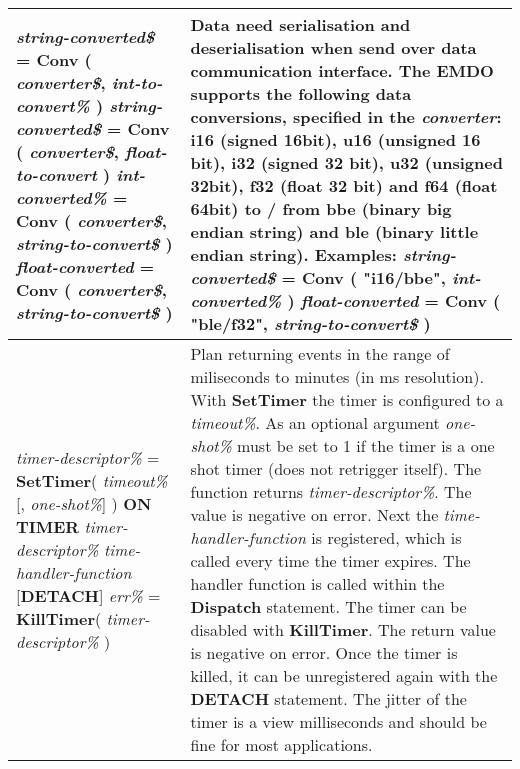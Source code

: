 \begin{table}[]
\begin{tabular}{|p{4cm}|p{10cm}|}
\\ \hline
\textit{string-converted\$} = \textbf{Conv} ( \textit{converter\$}, \textit{int-to-convert\%} )\newline
\textit{string-converted\$} = \textbf{Conv} ( \textit{converter\$}, \textit{float-to-convert} )\newline
\textit{int-converted\%} = \textbf{Conv} ( \textit{converter\$}, \textit{string-to-convert\$} )\newline
\textit{float-converted} = \textbf{Conv} ( \textit{converter\$}, \textit{string-to-convert\$} )
& Data need serialisation and deserialisation when send over data communication interface. The EMDO supports the following data conversions, specified in the \textit{converter}:\newline
i16 (signed 16bit), u16 (unsigned 16 bit), i32 (signed 32 bit), u32 (unsigned 32bit), f32 (float 32 bit) and f64 (float 64bit) to / from bbe (binary big endian string) and ble (binary little endian string).\newline
Examples:
\textit{string-converted\$} = \textbf{Conv} ( "i16/bbe", \textit{int-converted\%} ) \newline
\textit{float-converted} = \textbf{Conv} ( "ble/f32", \textit{string-to-convert\$} )
\\ \hline
\textit{timer-descriptor\%} = \textbf{SetTimer}( \textit{timeout\%} [, \textit{one-shot\%}] )\newline
\textbf{ON TIMER} \textit{timer-descriptor\%} \textit{time-handler-function} [\textbf{DETACH}]
\textit{err\%} = \textbf{KillTimer}( \textit{timer-descriptor\%} )
& Plan returning events in the range of miliseconds to minutes (in ms resolution). With \textbf{SetTimer} the timer is configured to a \textit{timeout\%}. As an optional argument \textit{one-shot\%} must be set to 1 if the timer is a one shot timer (does not retrigger itself). The function returns \textit{timer-descriptor\%}. The value is negative on error.\newline
Next the \textit{time-handler-function} is registered, which is called every time the timer expires.\newline
The handler function is called within the \textbf{Dispatch} statement.\newline
The timer can be disabled with \textbf{KillTimer}. The return value is negative on error.
Once the timer is killed, it can be unregistered again with the \textbf{DETACH} statement.\newline
The jitter of the timer is a view milliseconds and should be fine for most applications. 

\end{tabular}
\end{table}
